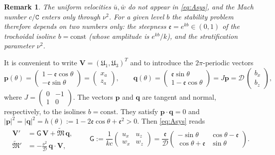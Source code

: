 \documentclass[10pt,a4paper]{amsart}
\newcommand{\cs}{\texttt{C}}
\newcommand{\Msf}{\mathsf{G}}
\newcommand{\B}{{\mathfrak{M}}}
\newcommand{\D}{\mathcal{D}}
\newcommand{\ee}{\mathfrak{e}}
\newtheorem{remark}[theorem]{Remark}
\begin{document}
\begin{remark}\label{rem:params}
The uniform velocities $\bar{u},\bar{w}$ do not appear in \eqref{eq:Asys}, and the Mach number $c/\cs$ enters only through $\nu^2$. For a given level $b$ the stability problem therefore depends on two numbers only: the steepness $\ee=e^{kb}\in(0,1)$ of the trochoidal isoline $b=\mathrm{const}$ (whose amplitude is $e^{kb}/k$), and the stratification parameter $\nu^2$.
\end{remark}
\noindent
It is convenient to write $\mathbf V=(\mathfrak{U}_1,\mathfrak{U}_3)^T$ and to introduce the $2\pi$-periodic vectors
\begin{equation}\label{eq:pq}
\mathbf p(\theta)=\begin{pmatrix}1-\ee\cos\theta\\-\ee\sin\theta\end{pmatrix}=\begin{pmatrix}
    x_a\\ z_a
\end{pmatrix},\qquad
\mathbf q(\theta)=\begin{pmatrix}\ee\sin\theta\\1-\ee\cos\theta\end{pmatrix}=J\mathbf p=\D\,\begin{pmatrix}
    b_x\\ b_z
\end{pmatrix},
\end{equation}
where $\displaystyle J=\begin{pmatrix}0&-1\\1&0\end{pmatrix}$. The vectors $\mathbf p$ and $\mathbf q$ are tangent and normal, respectively, to the isolines $b=\mathrm{const}$. They satisfy $\mathbf p\cdot\mathbf q=0$ and $|\mathbf p|^2=|\mathbf q|^2=h(\theta):=1-2\ee\cos\theta+\ee^2>0$. Then \eqref{eq:Asys} reads
\begin{equation}\label{eq:compact}
\begin{aligned}
    \mathbf V'&=\Msf\,\mathbf V+\widetilde{\B}\,\mathbf q,\\
\widetilde{\B}'&=-\frac{\nu^2}{\D}\,\mathbf q\cdot\mathbf V,
\end{aligned}\qquad
\Msf:=\frac{1}{kc}\begin{pmatrix}u_x&u_z\\w_x&w_z\end{pmatrix}
=\frac{\ee}{\D}\begin{pmatrix}-\sin\theta&\cos\theta-\ee\\ \cos\theta+\ee&\sin\theta\end{pmatrix}.
\end{equation}
\end{document}
